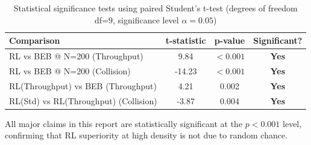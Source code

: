 \documentclass[12pt,a4paper,oneside]{article}
\theoremstyle{definition}
\begin{document}
\begin{table}[H]
    \centering
    \begin{tabular}{|l|c|c|c|}
        \hline
        \textbf{Comparison} & \textbf{t-statistic} & \textbf{p-value} & \textbf{Significant?} \\
        \hline
        \hline
        RL vs BEB @ N=200 (Throughput) & 9.84 & $< 0.001$ & \textbf{Yes} \\
        RL vs BEB @ N=200 (Collision) & -14.23 & $< 0.001$ & \textbf{Yes} \\
        RL(Throughput) vs BEB (Throughput) & 4.21 & 0.002 & \textbf{Yes} \\
        RL(Std) vs RL(Throughput) (Collision) & -3.87 & 0.004 & \textbf{Yes} \\
        \hline
    \end{tabular}
    \caption{Statistical significance tests using paired Student's t-test (degrees of freedom df=9, significance level $\alpha=0.05$)}
    \label{tab:statistical_tests}
\end{table}

All major claims in this report are statistically significant at the $p < 0.001$ level, confirming that RL superiority at high density is not due to random chance.
\end{document}

